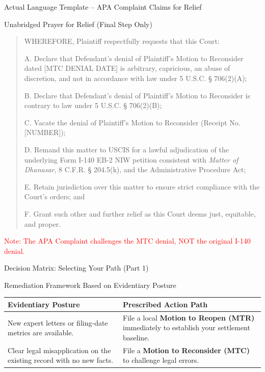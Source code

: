 \documentclass[11pt]{beamer}
\begin{document}
	\begin{frame}[allowframebreaks]{Actual Language Template -- APA Complaint Claims for Relief}
		\scriptsize
		\begin{block}{Unabridged Prayer for Relief (Final Step Only)}
			\begin{quote}
				WHEREFORE, Plaintiff respectfully requests that this Court:
				
				A. Declare that Defendant's denial of Plaintiff's Motion to Reconsider dated [MTC DENIAL DATE] is arbitrary, capricious, an abuse of discretion, and not in accordance with law under 5 U.S.C. § 706(2)(A);
				
				B. Declare that Defendant's denial of Plaintiff's Motion to Reconsider is contrary to law under 5 U.S.C. § 706(2)(B);
				
				C. Vacate the denial of Plaintiff's Motion to Reconsider (Receipt No. [NUMBER]);
				
				D. Remand this matter to USCIS for a lawful adjudication of the underlying Form I-140 EB-2 NIW petition consistent with \textit{Matter of Dhanasar}, 8 C.F.R. § 204.5(k), and the Administrative Procedure Act;
				
				E. Retain jurisdiction over this matter to ensure strict compliance with the Court's orders; and
				
				F. Grant such other and further relief as this Court deems just, equitable, and proper.
			\end{quote}
			\textcolor{red}{Note: The APA Complaint challenges the MTC denial, NOT the original I-140 denial.}
		\end{block}
	\end{frame}
	
	
	\begin{frame}{Decision Matrix: Selecting Your Path (Part 1)}
		\scriptsize
		\begin{block}{Remediation Framework Based on Evidentiary Posture}
			\centering
			\begin{tabular}{|p{4cm}|p{6.5cm}|}
				\hline
				\textbf{Evidentiary Posture} & \textbf{Prescribed Action Path} \\
				\hline
				New expert letters or filing-date metrics are available. & File a local \textbf{Motion to Reopen (MTR)} immediately to establish your settlement baseline. \\
				\hline
				Clear legal misapplication on the existing record with no new facts. & File a \textbf{Motion to Reconsider (MTC)} to challenge legal errors. \\
				\hline
			\end{tabular}
		\end{block}
	\end{frame}
	
\end{document}
